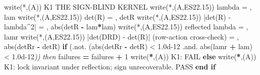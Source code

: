 \documentclass[10pt]{article}
\renewcommand{\_}{\origunderscore\allowbreak}
\newenvironment{Shaded}{}{}
\newcommand{\BuiltInTok}[1]{#1}
\newcommand{\CommentTok}[1]{\textit{#1}}
\newcommand{\DecValTok}[1]{#1}
\newcommand{\FloatTok}[1]{#1}
\newcommand{\FunctionTok}[1]{#1}
\newcommand{\KeywordTok}[1]{\textbf{#1}}
\newcommand{\NormalTok}[1]{#1}
\newcommand{\OperatorTok}[1]{#1}
\newcommand{\StringTok}[1]{#1}
\begin{document}
\begin{Shaded}
\begin{Highlighting}[]
  \FunctionTok{write(*}\NormalTok{,}\StringTok{\textquotesingle{}(A)\textquotesingle{}}\FunctionTok{)} \StringTok{\textquotesingle{}K1 THE SIGN{-}BLIND KERNEL\textquotesingle{}}
  \FunctionTok{write(*}\NormalTok{,}\StringTok{\textquotesingle{}(A,ES22.15)\textquotesingle{}}\FunctionTok{)} \StringTok{\textquotesingle{}  lambda                = \textquotesingle{}}\NormalTok{, lam}
  \FunctionTok{write(*}\NormalTok{,}\StringTok{\textquotesingle{}(A,ES22.15)\textquotesingle{}}\FunctionTok{)} \StringTok{\textquotesingle{}  det(R)                = \textquotesingle{}}\NormalTok{, detR}
  \FunctionTok{write(*}\NormalTok{,}\StringTok{\textquotesingle{}(A,ES22.15)\textquotesingle{}}\FunctionTok{)} \StringTok{\textquotesingle{}  |det(R) {-} lambda\^{}2|   = \textquotesingle{}}\NormalTok{, }\BuiltInTok{abs}\NormalTok{(detR }\KeywordTok{{-}}\NormalTok{ lam}\KeywordTok{*}\NormalTok{lam)}
  \FunctionTok{write(*}\NormalTok{,}\StringTok{\textquotesingle{}(A,ES22.15)\textquotesingle{}}\FunctionTok{)} \StringTok{\textquotesingle{}  reflected lambda      = \textquotesingle{}}\NormalTok{, lamr}
  \FunctionTok{write(*}\NormalTok{,}\StringTok{\textquotesingle{}(A,ES22.15)\textquotesingle{}}\FunctionTok{)} \StringTok{\textquotesingle{}  |det(DRD) {-} det(R)| (row{-}action cross{-}check) = \textquotesingle{}}\NormalTok{, }\BuiltInTok{abs}\NormalTok{(detRr }\KeywordTok{{-}}\NormalTok{ detR)}
  \KeywordTok{if}\NormalTok{ (}\OperatorTok{.not.}\NormalTok{ (}\BuiltInTok{abs}\NormalTok{(detRr }\KeywordTok{{-}}\NormalTok{ detR) }\OperatorTok{\textless{}} \FloatTok{1.0d{-}12} \OperatorTok{.and.} \BuiltInTok{abs}\NormalTok{(lamr }\KeywordTok{+}\NormalTok{ lam) }\OperatorTok{\textless{}} \FloatTok{1.0d{-}12}\CommentTok{)) then}
\BuiltInTok{     f}\NormalTok{ailures }\KeywordTok{=}\NormalTok{ failures }\KeywordTok{+} \DecValTok{1}
\BuiltInTok{     w}\NormalTok{rite(}\KeywordTok{*}\NormalTok{,}\StringTok{\textquotesingle{}(A)\textquotesingle{}}\NormalTok{) }\StringTok{\textquotesingle{}  K1: FAIL\textquotesingle{}}
  \KeywordTok{else}
\BuiltInTok{     w}\NormalTok{rite(}\KeywordTok{*}\NormalTok{,}\StringTok{\textquotesingle{}(A)\textquotesingle{}}\NormalTok{) }\StringTok{\textquotesingle{}  K1: lock invariant under reflection; sign unrecoverable. PASS\textquotesingle{}}
  \KeywordTok{end if}


\end{Highlighting}
\end{Shaded}
\end{document}
